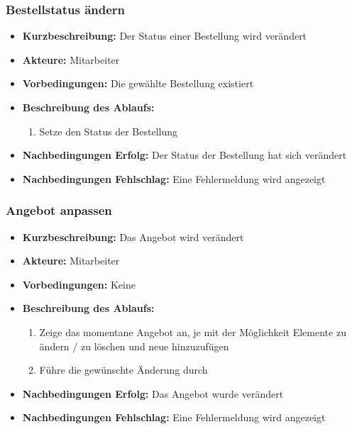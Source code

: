 \documentclass[a4paper]{report}
\begin{document}
\subsubsection*{Bestellstatus ändern}
\begin{itemize}
    \item \textbf{Kurzbeschreibung:} Der Status einer Bestellung wird verändert
    \item \textbf{Akteure:} Mitarbeiter
    \item \textbf{Vorbedingungen:} Die gewählte Bestellung existiert 
    \item \textbf{Beschreibung des Ablaufs:}
        \begin{enumerate}
            \item Setze den Status der Bestellung
        \end{enumerate}
    \item \textbf{Nachbedingungen Erfolg:} Der Status der Bestellung hat sich verändert
    \item \textbf{Nachbedingungen Fehlschlag:} Eine Fehlermeldung wird angezeigt 
\end{itemize}
%
\subsubsection*{Angebot anpassen}
\begin{itemize}
    \item \textbf{Kurzbeschreibung:} Das Angebot wird verändert
    \item \textbf{Akteure:} Mitarbeiter
    \item \textbf{Vorbedingungen:} Keine
    \item \textbf{Beschreibung des Ablaufs:}
        \begin{enumerate}
            \item Zeige das momentane Angebot an, je mit der Möglichkeit Elemente zu ändern / zu löschen und neue hinzuzufügen
            \item Führe die gewünschte Änderung durch
        \end{enumerate}
    \item \textbf{Nachbedingungen Erfolg:} Das Angebot wurde verändert
    \item \textbf{Nachbedingungen Fehlschlag:} Eine Fehlermeldung wird angezeigt 
\end{itemize}
%
\end{document}
